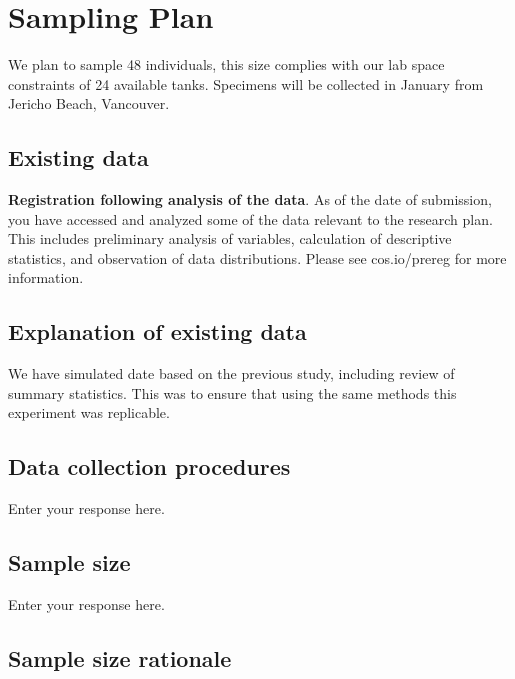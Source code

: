 \documentclass[]{article}
\begin{document}
\hypertarget{sampling-plan}{%
\section{Sampling Plan}\label{sampling-plan}}

We plan to sample 48 individuals, this size complies with our lab space
constraints of 24 available tanks. Specimens will be collected in
January from Jericho Beach, Vancouver.

\hypertarget{existing-data}{%
\subsection{Existing data}\label{existing-data}}

\textbf{Registration following analysis of the data}. As of the date of
submission, you have accessed and analyzed some of the data relevant to
the research plan. This includes preliminary analysis of variables,
calculation of descriptive statistics, and observation of data
distributions. Please see cos.io/prereg for more information.

\hypertarget{explanation-of-existing-data}{%
\subsection{Explanation of existing
data}\label{explanation-of-existing-data}}

We have simulated date based on the previous study, including review of
summary statistics. This was to ensure that using the same methods this
experiment was replicable.

\hypertarget{data-collection-procedures}{%
\subsection{Data collection
procedures}\label{data-collection-procedures}}

Enter your response here.

\hypertarget{sample-size}{%
\subsection{Sample size}\label{sample-size}}

Enter your response here.

\hypertarget{sample-size-rationale}{%
\subsection{Sample size rationale}\label{sample-size-rationale}}
\end{document}
